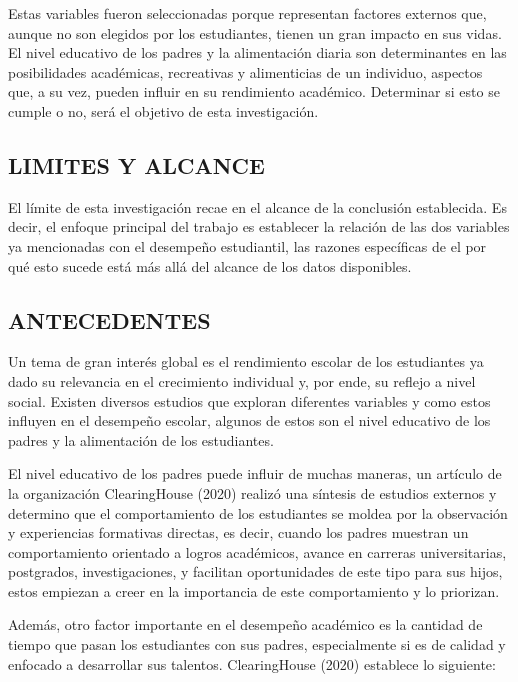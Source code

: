 \documentclass[
]{article}
\begin{document}
Estas variables fueron seleccionadas porque representan factores
externos que, aunque no son elegidos por los estudiantes, tienen un gran
impacto en sus vidas. El nivel educativo de los padres y la alimentación
diaria son determinantes en las posibilidades académicas, recreativas y
alimenticias de un individuo, aspectos que, a su vez, pueden influir en
su rendimiento académico. Determinar si esto se cumple o no, será el
objetivo de esta investigación.

\subsection{LIMITES Y ALCANCE}\label{limites-y-alcance}

El límite de esta investigación recae en el alcance de la conclusión
establecida. Es decir, el enfoque principal del trabajo es establecer la
relación de las dos variables ya mencionadas con el desempeño
estudiantil, las razones específicas de el por qué esto sucede está más
allá del alcance de los datos disponibles.

\subsection{ANTECEDENTES}\label{antecedentes}

Un tema de gran interés global es el rendimiento escolar de los
estudiantes ya dado su relevancia en el crecimiento individual y, por
ende, su reflejo a nivel social. Existen diversos estudios que exploran
diferentes variables y como estos influyen en el desempeño escolar,
algunos de estos son el nivel educativo de los padres y la alimentación
de los estudiantes.

El nivel educativo de los padres puede influir de muchas maneras, un
artículo de la organización ClearingHouse (2020) realizó una síntesis de
estudios externos y determino que el comportamiento de los estudiantes
se moldea por la observación y experiencias formativas directas, es
decir, cuando los padres muestran un comportamiento orientado a logros
académicos, avance en carreras universitarias, postgrados,
investigaciones, y facilitan oportunidades de este tipo para sus hijos,
estos empiezan a creer en la importancia de este comportamiento y lo
priorizan.

Además, otro factor importante en el desempeño académico es la cantidad
de tiempo que pasan los estudiantes con sus padres, especialmente si es
de calidad y enfocado a desarrollar sus talentos. ClearingHouse (2020)
establece lo siguiente:
\end{document}
